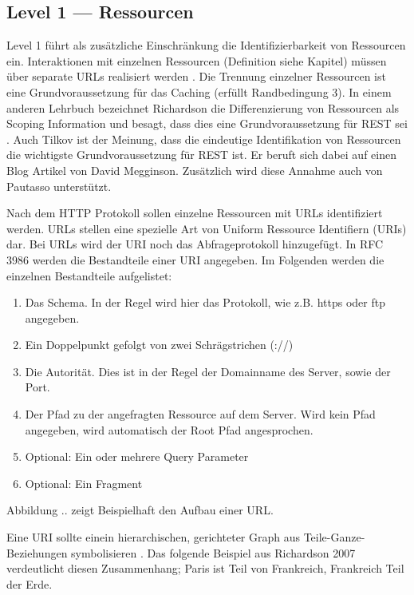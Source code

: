 \subsection{Level 1 — Ressourcen}\label{subsection:level-1}

Level 1 führt als zusätzliche Einschränkung die Identifizierbarkeit von Ressourcen ein. Interaktionen mit einzelnen Ressourcen (Definition siehe Kapitel) müssen über separate URLs realisiert werden   . Die Trennung einzelner Ressourcen ist eine Grundvoraussetzung für das Caching (erfüllt Randbedingung 3). In einem anderen Lehrbuch bezeichnet Richardson die Differenzierung von Ressourcen als Scoping Information und besagt, dass dies eine Grundvoraussetzung für REST sei . Auch Tilkov ist der Meinung, dass die eindeutige Identifikation von Ressourcen die wichtigste Grundvoraussetzung für REST ist. Er beruft sich dabei auf einen Blog Artikel von David Megginson. Zusätzlich wird diese Annahme auch von Pautasso unterstützt.

Nach dem HTTP Protokoll sollen einzelne Ressourcen mit URLs identifiziert werden. URLs stellen eine spezielle Art von Uniform Ressource Identifiern (URIs) dar. Bei URLs wird der URI noch das Abfrageprotokoll hinzugefügt. In RFC 3986 werden die Bestandteile einer URI angegeben. Im Folgenden werden die einzelnen Bestandteile aufgelistet:

\begin{enumerate}
    \item Das Schema. In der Regel wird hier das Protokoll, wie z.B. https oder ftp angegeben.
    \item Ein Doppelpunkt gefolgt von zwei Schrägstrichen (://)
    \item Die Autorität. Dies ist in der Regel der Domainname des Server, sowie der Port.
    \item Der Pfad zu der angefragten Ressource auf dem Server. Wird kein Pfad angegeben, wird automatisch der Root Pfad angesprochen.
    \item Optional: Ein oder mehrere Query Parameter
    \item Optional: Ein Fragment
\end{enumerate}

Abbildung .. zeigt Beispielhaft den Aufbau einer URL. 

Eine URI sollte einein hierarchischen, gerichteter Graph  aus Teile-Ganze-Beziehungen symbolisieren . Das folgende Beispiel aus Richardson 2007 verdeutlicht diesen Zusammenhang; Paris ist Teil von Frankreich, Frankreich Teil der Erde.

